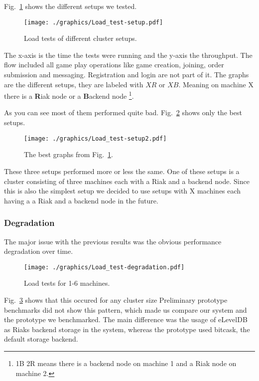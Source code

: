 \documentclass[11pt,a4paper]{report}
\begin{document}
Fig.~\ref{fig:load_test:setup} shows the different setups we tested.
\begin{figure}[htbp!]
 \hspace{-2.5cm}
 \texttt{[image: ./graphics/Load\_test-setup.pdf]}
 \caption{Load tests of different cluster setups.}
 \label{fig:load_test:setup}
\end{figure}
The x-axis is the time the tests were running and the y-axis the throughput.
The flow included all game play operations like game creation, joining,
order submission and messaging.
Registration and login are not part of it.
The graphs are the different setups, they are labeled with $XR$ or $XB$.
Meaning on machine X there is a {\bf R}iak node or a {\bf B}ackend node
\footnote{1B 2R means there is a backend node on machine 1 and a Riak node on machine 2.}.

As you can see most of them performed quite bad.
Fig.~\ref{fig:load_test:setup2} shows only the best setups.
\begin{figure}[htbp!]
 \hspace{-2.5cm}
 \texttt{[image: ./graphics/Load\_test-setup2.pdf]}
 \caption{The best graphs from Fig.~\ref{fig:load_test:setup}.}
 \label{fig:load_test:setup2}
\end{figure}
These three setups performed more or less the same.
One of these setups is a cluster consisting of three machines each with a Riak and a backend node.
Since this is also the simplest setup we decided to use setups with X machines
each having a a Riak and a backend node in the future.


\subsubsection{Degradation}
The major issue with the previous results was the obvious performance degradation over time.
\begin{figure}[htbp!]
 \hspace{-2.5cm}
 \texttt{[image: ./graphics/Load\_test-degradation.pdf]}
 \caption{Load tests for 1-6 machines.}
 \label{fig:load_test:degradation}
\end{figure}
Fig.~\ref{fig:load_test:degradation} shows that this occured for any cluster size
Preliminary prototype benchmarks did not show this pattern,
which made us compare our system and the prototype we benchmarked.
The main difference was the usage of eLevelDB as Riaks backend storage in the system,
whereas the prototype used bitcask, the default storage backend.
\end{document}
